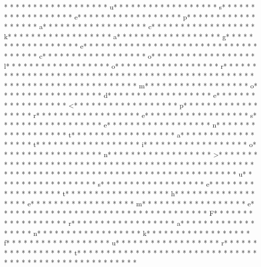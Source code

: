 * * *  * * *  * * *  *  * * *  *  * * *  * u* * *  * * *  * * *  *  * * *  *  * * *  * s* * *  * * *  * * *  *  * * *  *  * * *  * e* * *  * * *  * * *  *  * * *  *  * * *  * p* * *  * * *  * * *  *  * * *  *  * * *  * a* * *  * * *  * * *  *  * * *  *  * * *  * c* * *  * * *  * * *  *  * * *  *  * * *  * k* * *  * * *  * * *  *  * * *  *  * * *  * a* * *  * * *  * * *  *  * * *  *  * * *  * g* * *  * * *  * * *  *  * * *  *  * * *  * e* * *  * * *  * * *  *  * * *  *  * * *  * {* * *  * * *  * * *  *  * * *  *  * * *  * c* * *  * * *  * * *  *  * * *  *  * * *  * o* * *  * * *  * * *  *  * * *  *  * * *  * l* * *  * * *  * * *  *  * * *  *  * * *  * o* * *  * * *  * * *  *  * * *  *  * * *  * r* * *  * * *  * * *  *  * * *  *  * * *  * }* * *  * * *  * * *  *  * * *  *  * * *  * 
* * *  * * *  * * *  *  * * *  *  * * *  * 
* * *  * * *  * * *  *  * * *  *  * * *  * m* * *  * * *  * * *  *  * * *  *  * * *  * o* * *  * * *  * * *  *  * * *  *  * * *  * d* * *  * * *  * * *  *  * * *  *  * * *  * e* * *  * * *  * * *  *  * * *  *  * * *  * <* * *  * * *  * * *  *  * * *  *  * * *  * p* * *  * * *  * * *  *  * * *  *  * * *  * r* * *  * * *  * * *  *  * * *  *  * * *  * e* * *  * * *  * * *  *  * * *  *  * * *  * s* * *  * * *  * * *  *  * * *  *  * * *  * e* * *  * * *  * * *  *  * * *  *  * * *  * n* * *  * * *  * * *  *  * * *  *  * * *  * t* * *  * * *  * * *  *  * * *  *  * * *  * a* * *  * * *  * * *  *  * * *  *  * * *  * t* * *  * * *  * * *  *  * * *  *  * * *  * i* * *  * * *  * * *  *  * * *  *  * * *  * o* * *  * * *  * * *  *  * * *  *  * * *  * n* * *  * * *  * * *  *  * * *  *  * * *  * >* * *  * * *  * * *  *  * * *  *  * * *  *  * * *  * * *  * * *  *  * * *  *  * * *  * {* * *  * * *  * * *  *  * * *  *  * * *  * 
* * *  * * *  * * *  *  * * *  *  * * *  *  * * *  * * *  * * *  *  * * *  *  * * *  * u* * *  * * *  * * *  *  * * *  *  * * *  * s* * *  * * *  * * *  *  * * *  *  * * *  * e* * *  * * *  * * *  *  * * *  *  * * *  * t* * *  * * *  * * *  *  * * *  *  * * *  * h* * *  * * *  * * *  *  * * *  *  * * *  * e* * *  * * *  * * *  *  * * *  *  * * *  * m* * *  * * *  * * *  *  * * *  *  * * *  * e* * *  * * *  * * *  *  * * *  *  * * *  * {* * *  * * *  * * *  *  * * *  *  * * *  * F* * *  * * *  * * *  *  * * *  *  * * *  * r* * *  * * *  * * *  *  * * *  *  * * *  * a* * *  * * *  * * *  *  * * *  *  * * *  * n* * *  * * *  * * *  *  * * *  *  * * *  * k* * *  * * *  * * *  *  * * *  *  * * *  * f* * *  * * *  * * *  *  * * *  *  * * *  * u* * *  * * *  * * *  *  * * *  *  * * *  * r* * *  * * *  * * *  *  * * *  *  * * *  * t* * *  * * *  * * *  *  * * *  *  * * *  * }* * *  * * *  * * *  *  * * *  *  * * *  *  * * *  * * *  * * *  *  * * *  *  * * *  * %
}
